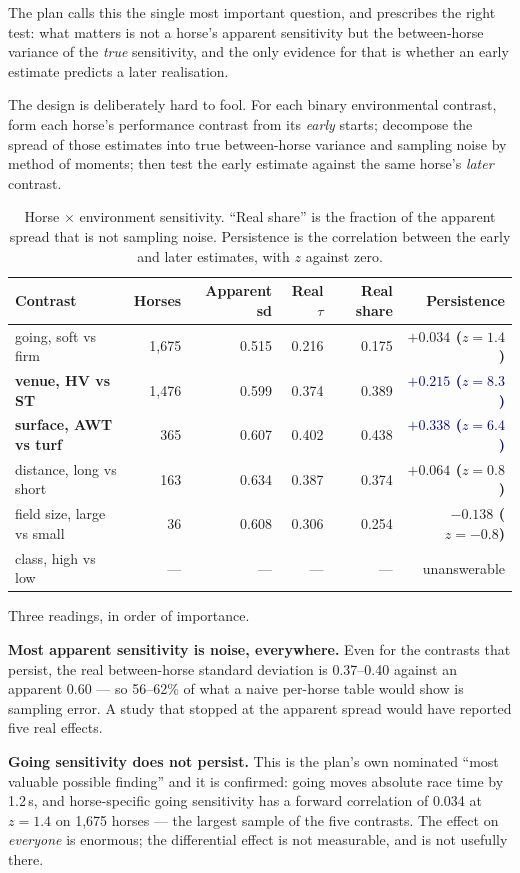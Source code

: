 \documentclass[11pt,a4paper]{article}
\newcommand{\good}[1]{\textcolor{darkblue}{\textbf{#1}}}
\newcommand{\bad}[1]{\textcolor{warm}{\textbf{#1}}}
\begin{document}
The plan calls this the single most important question, and prescribes the right
test: what matters is not a horse's apparent sensitivity but the between-horse
variance of the \emph{true} sensitivity, and the only evidence for that is whether
an early estimate predicts a later realisation.

The design is deliberately hard to fool. For each binary environmental contrast,
form each horse's performance contrast from its \emph{early} starts; decompose the
spread of those estimates into true between-horse variance and sampling noise by
method of moments; then test the early estimate against the same horse's
\emph{later} contrast.

\begin{table}[htbp]\centering\small
\caption{Horse $\times$ environment sensitivity. ``Real share'' is the fraction of
the apparent spread that is not sampling noise. Persistence is the correlation
between the early and later estimates, with $z$ against zero.}
\begin{tabular}{lrrrrr}
\toprule
Contrast & Horses & Apparent sd & Real $\tau$ & Real share & Persistence\\
\midrule
going, soft vs firm & 1{,}675 & 0.515 & 0.216 & 0.175 & \bad{$+0.034$ ($z=1.4$)}\\
\textbf{venue, HV vs ST} & 1{,}476 & 0.599 & 0.374 & 0.389 & \good{$+0.215$ ($z=8.3$)}\\
\textbf{surface, AWT vs turf} & 365 & 0.607 & 0.402 & 0.438 & \good{$+0.338$ ($z=6.4$)}\\
distance, long vs short & 163 & 0.634 & 0.387 & 0.374 & \bad{$+0.064$ ($z=0.8$)}\\
field size, large vs small & 36 & 0.608 & 0.306 & 0.254 & \bad{$-0.138$ ($z=-0.8$)}\\
class, high vs low & --- & --- & --- & --- & unanswerable\\
\bottomrule
\end{tabular}
\end{table}

Three readings, in order of importance.

\textbf{Most apparent sensitivity is noise, everywhere.} Even for the contrasts
that persist, the real between-horse standard deviation is 0.37--0.40 against an
apparent 0.60 --- so 56--62\% of what a naive per-horse table would show is
sampling error. A study that stopped at the apparent spread would have reported
five real effects.

\textbf{Going sensitivity does not persist.} This is the plan's own nominated
``most valuable possible finding'' and it is confirmed: going moves absolute race
time by 1.2\,s, and horse-specific going sensitivity has a forward correlation of
0.034 at $z=1.4$ on 1{,}675 horses --- the largest sample of the five contrasts.
The effect on \emph{everyone} is enormous; the differential effect is not
measurable, and is not usefully there.
\end{document}

